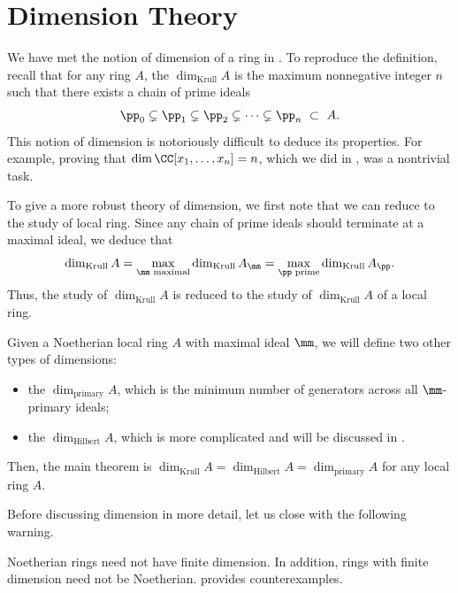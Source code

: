 \newcommand{\dimK}{\dim_{\text{Krull}}}
\newcommand{\dimH}{\dim_{\text{Hilbert}}}
\newcommand{\dimP}{\dim_{\text{primary}}}
\newcommand{\height}{\operatorname{ht}}
\chapter{Dimension Theory}
\label{chap:dimension}
We have met the notion of dimension of a ring in
.
To reproduce the definition, recall that
for any ring $A$, the 
\notation{$\dimK A$}{Krull dimension}
$\dimK A$ is the maximum nonnegative integer
$n$ such that there exists a chain of prime ideals
$$\pp_0\subsetneq \pp_1 \subsetneq \pp_2
\subsetneq \dots\subsetneq \pp_n \ \subset\ A.$$
This notion of dimension is notoriously difficult
to deduce its properties.
For example, proving that $\dim \CC[x_1,\dots,x_n]=n$,
which we did in , was a nontrivial task.

To give a more robust theory of dimension,
we first note that we can reduce to the study of local ring.
Since any chain of prime ideals should terminate at a maximal ideal,
we deduce that
$$\dimK A = \max_{\mm\text{ maximal}} \dimK A_\mm 
= \max_{\pp\text{ prime}} \dimK A_\pp.$$
Thus, the study of $\dimK A$ is reduced to the study
of $\dimK A$ of a local ring.

Given a Noetherian local ring $A$ with maximal ideal $\mm$,
we will define two other types of dimensions:
\begin{itemize}
    \item the 
    $\dimP A$,
    which is the minimum number of generators
    across all $\mm$-primary ideals;
    \item the 
    $\dimH A$, which is more complicated and will be discussed
    in .
\end{itemize}
Then, the main theorem is 
$\dimK A = \dimH A = \dimP A$ for any local ring $A$.

Before discussing dimension in more detail,
let us close with the following warning.
\begin{warn}
Noetherian rings need not have finite dimension.
In addition, rings with finite dimension need 
not be Noetherian.
 provides counterexamples.
\end{warn}
